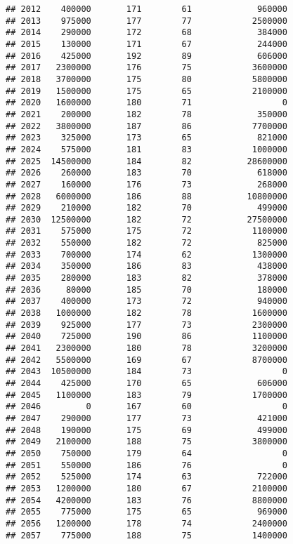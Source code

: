 \documentclass[
]{article}
\begin{document}
\begin{verbatim}
## 2012    400000       171        61             960000
## 2013    975000       177        77            2500000
## 2014    290000       172        68             384000
## 2015    130000       171        67             244000
## 2016    425000       192        89             606000
## 2017   2300000       176        75            3600000
## 2018   3700000       175        80            5800000
## 2019   1500000       175        65            2100000
## 2020   1600000       180        71                  0
## 2021    200000       182        78             350000
## 2022   3800000       187        86            7700000
## 2023    325000       173        65             821000
## 2024    575000       181        83            1000000
## 2025  14500000       184        82           28600000
## 2026    260000       183        70             618000
## 2027    160000       176        73             268000
## 2028   6000000       186        88           10800000
## 2029    210000       182        70             499000
## 2030  12500000       182        72           27500000
## 2031    575000       175        72            1100000
## 2032    550000       182        72             825000
## 2033    700000       174        62            1300000
## 2034    350000       186        83             438000
## 2035    280000       183        82             378000
## 2036     80000       185        70             180000
## 2037    400000       173        72             940000
## 2038   1000000       182        78            1600000
## 2039    925000       177        73            2300000
## 2040    725000       190        86            1100000
## 2041   2300000       180        78            3200000
## 2042   5500000       169        67            8700000
## 2043  10500000       184        73                  0
## 2044    425000       170        65             606000
## 2045   1100000       183        79            1700000
## 2046         0       167        60                  0
## 2047    290000       177        73             421000
## 2048    190000       175        69             499000
## 2049   2100000       188        75            3800000
## 2050    750000       179        64                  0
## 2051    550000       186        76                  0
## 2052    525000       174        63             722000
## 2053   1200000       180        67            2100000
## 2054   4200000       183        76            8800000
## 2055    775000       175        65             969000
## 2056   1200000       178        74            2400000
## 2057    775000       188        75            1400000

\end{verbatim}
\end{document}
